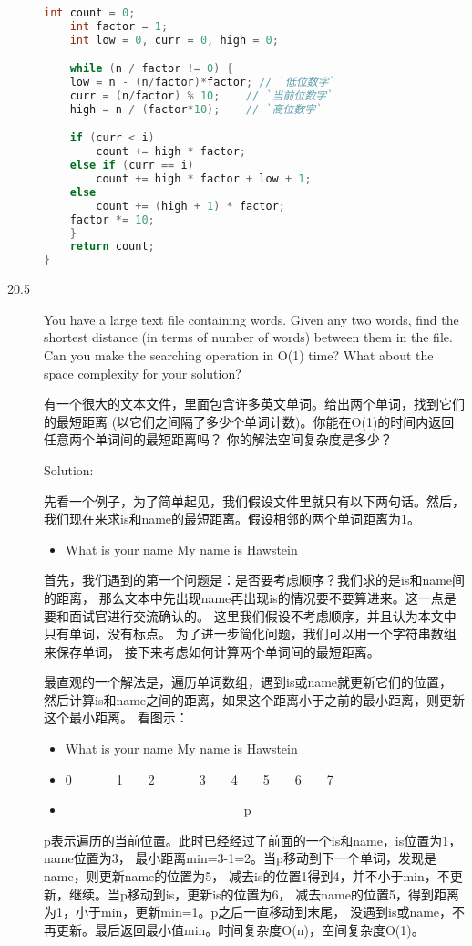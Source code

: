 \begin{description}
\begin{lstlisting}[language=C++]
    int count = 0; 
    int factor = 1;
    int low = 0, curr = 0, high = 0;

    while (n / factor != 0) {
	low = n - (n/factor)*factor; // `低位数字`
	curr = (n/factor) % 10;    // `当前位数字`
	high = n / (factor*10);    // `高位数字`

	if (curr < i)
	    count += high * factor;
	else if (curr == i) 
	    count += high * factor + low + 1;
	else 
	    count += (high + 1) * factor;
	factor *= 10;
    }
    return count;
}
\end{lstlisting}
%


\item[20.5] You have a large text file containing words. Given any two words, find the shortest distance (in terms of number of words) between them in the file. Can you make the searching operation in O(1) time? What about the space complexity for your solution?

有一个很大的文本文件，里面包含许多英文单词。给出两个单词，找到它们的最短距离 (以它们之间隔了多少个单词计数)。你能在O(1)的时间内返回任意两个单词间的最短距离吗？ 你的解法空间复杂度是多少？

Solution:

先看一个例子，为了简单起见，我们假设文件里就只有以下两句话。然后， 我们现在来求is和name的最短距离。假设相邻的两个单词距离为1。
\begin{itemize}
\item What is your name My name is Hawstein
\end{itemize}
首先，我们遇到的第一个问题是：是否要考虑顺序？我们求的是is和name间的距离， 那么文本中先出现name再出现is的情况要不要算进来。这一点是要和面试官进行交流确认的。 这里我们假设不考虑顺序，并且认为本文中只有单词，没有标点。 为了进一步简化问题，我们可以用一个字符串数组来保存单词， 接下来考虑如何计算两个单词间的最短距离。

最直观的一个解法是，遍历单词数组，遇到is或name就更新它们的位置， 然后计算is和name之间的距离，如果这个距离小于之前的最小距离，则更新这个最小距离。 看图示：
\begin{itemize}
  \itemsep=-3pt
\item What is your name My name is Hawstein
\item 0\ \ \ \ \ \ \ 1\ \ \ \ 2\ \ \ \ \ \ \ 3\ \ \ \ 4\ \ \ \ 5\ \ \ \ 6\ \ \ \ 7
\item \ \ \ \ \ \ \ \ \ \ \ \ \ \ \ \ \ \ \ \ \ \ \ \ \ \ \ \ p
\end{itemize}
p表示遍历的当前位置。此时已经经过了前面的一个is和name，is位置为1，name位置为3， 最小距离min=3-1=2。当p移动到下一个单词，发现是name，则更新name的位置为5， 减去is的位置1得到4，并不小于min，不更新，继续。当p移动到is，更新is的位置为6， 减去name的位置5，得到距离为1，小于min，更新min=1。p之后一直移动到末尾， 没遇到is或name，不再更新。最后返回最小值min。时间复杂度O(n)，空间复杂度O(1)。


\end{description}

